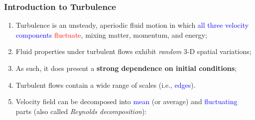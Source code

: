 \documentclass[10pt,compress]{beamer}
\newcommand{\red}{\textcolor{red}}
\newcommand{\blue}{\textcolor{blue}}
\begin{document}
\begin{frame}
 \frametitle{Introduction to Turbulence}
   \begin{enumerate}
      \item<1-> Turbulence is an unsteady, aperiodic fluid motion in which \blue{all three velocity components} \red{fluctuate}, mixing matter, momentum, and energy;
      \item<1-> Fluid properties under turbulent flows exhibit {\it random} 3-D spatial variations;
      \item<1-> As such, it does present a {\bf strong dependence on initial conditions};
      \item<1-> Turbulent flows contain a wide range of scales (i.e., \blue{edges}).
      \item<2-> Velocity field can be decomposed into \blue{mean} (or average) and \blue{fluctuating} parts (also called {\it Reynolds decomposition}):
   \end{enumerate}
\end{frame}
\end{document}
